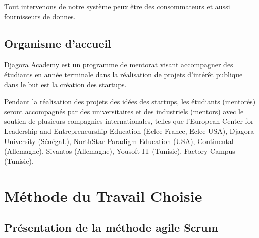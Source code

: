 Tout intervenons de notre système peux être des consommateurs et aussi fournisseurs
de donnes.

\subsection{Organisme d'accueil}

Djagora Academy est un programme de mentorat visant accompagner des étudiants
en année terminale dans la réalisation de projets d'intérêt publique dans le
but est la création des startups.

Pendant la réalisation des projets des idées des startups, les étudiants
(mentorés) seront accompagnés par des universitaires et des industriels
(mentors) avec le soutien de plusieurs compagnies internationales, telles que
l'European Center for Leadership and Entrepreneurship Education (Eclee France,
Eclee USA), Djagora University (SénégaL), NorthStar Paradigm Education (USA),
Continental (Allemagne), Sivantos (Allemagne), Yousoft-IT (Tunisie), Factory
Campus (Tunisie).



\section{Méthode du Travail Choisie}

\subsection{Présentation de la méthode agile Scrum}

